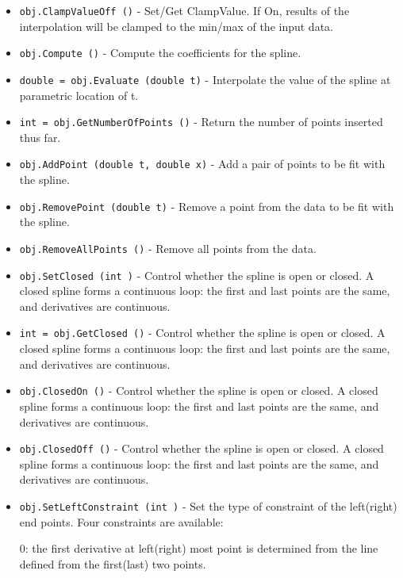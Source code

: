 \begin{itemize}
\item  \verb|obj.ClampValueOff ()| -  Set/Get ClampValue. If On, results of the interpolation will be
 clamped to the min/max of the input data.

\item  \verb|obj.Compute ()| -  Compute the coefficients for the spline.

\item  \verb|double = obj.Evaluate (double t)| -  Interpolate the value of the spline at parametric location of t.

\item  \verb|int = obj.GetNumberOfPoints ()| -  Return the number of points inserted thus far.

\item  \verb|obj.AddPoint (double t, double x)| -  Add a pair of points to be fit with the spline.

\item  \verb|obj.RemovePoint (double t)| -  Remove a point from the data to be fit with the spline.

\item  \verb|obj.RemoveAllPoints ()| -  Remove all points from the data.

\item  \verb|obj.SetClosed (int )| -  Control whether the spline is open or closed. A closed spline forms
 a continuous loop: the first and last points are the same, and
 derivatives are continuous.

\item  \verb|int = obj.GetClosed ()| -  Control whether the spline is open or closed. A closed spline forms
 a continuous loop: the first and last points are the same, and
 derivatives are continuous.

\item  \verb|obj.ClosedOn ()| -  Control whether the spline is open or closed. A closed spline forms
 a continuous loop: the first and last points are the same, and
 derivatives are continuous.

\item  \verb|obj.ClosedOff ()| -  Control whether the spline is open or closed. A closed spline forms
 a continuous loop: the first and last points are the same, and
 derivatives are continuous.

\item  \verb|obj.SetLeftConstraint (int )| -  Set the type of constraint of the left(right) end points. Four
 constraints are available:
 
 0: the first derivative at left(right) most point is determined
 from the line defined from the first(last) two points.


\end{itemize}
